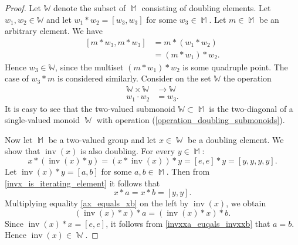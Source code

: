 \documentclass[10pt,a4paper]{amsart}
\DeclareMathOperator{\M}{\mathbb{M}}
\DeclareMathOperator{\W}{\mathbb{W}}
\DeclareMathOperator{\inv}{\mathrm{inv}}
\begin{document}
\begin{proof}
Let $\mathbb{W}$ denote the subset of $\M$ consisting of doubling elements. Let $w_1, w_2\in\mathbb{W}$ and let $w_1\ast w_2 = [w_3, w_3]$ for some $w_3\in\M$. Let $m\in\M$ be an arbitrary element. We have
$$\begin{aligned}
[m\ast w_3, m\ast w_3] &= m\ast (w_1\ast w_2)\\
&= (m\ast w_1)\ast w_2.
\end{aligned}$$
Hence $w_3\in \mathbb{W}$, since the multiset $(m\ast w_1)\ast w_2$ is some quadruple point. The case of $w_3\ast m$ is considered similarly. Consider on the set $\mathbb{W}$ the operation
\begin{equation}
\begin{aligned}\label{operation_doubling_submonoids}
\mathbb{W}\times \mathbb{W}&\to \mathbb{W}\\
w_1\cdot w_2 &= w_3.
\end{aligned}
\end{equation}
It is easy to see that the two-valued submonoid $\mathbb{W}\subset\M$ is the two-diagonal of a single-valued monoid $\W$ with operation (\ref{operation_doubling_submonoids}).

{Now let $\M$ be a two-valued group and let $x\in \W$ be a doubling element. We show that $\inv(x)$ is also doubling. For every $y\in\M$:
\begin{equation}\label{invx_is_iterating_element}
x\ast(\inv(x)\ast y) = (x\ast \inv(x))\ast y = [e,e]\ast y =  [y,y,y,y].
\end{equation}
Let $\inv(x)\ast y = [a, b]$ for some $a, b\in \M$. Then from \eqref{invx_is_iterating_element} it follows that
\begin{equation}\label{ax_equals_xb}
x\ast a = x\ast b = [y,y].
\end{equation}
Multiplying equality \eqref{ax_equals_xb} on the left by $\inv(x)$, we obtain
\begin{equation}\label{invxxa_euqals_invxxb}
(\inv(x)\ast x)\ast a = (\inv(x)\ast x)\ast b.
\end{equation}
Since $\inv(x)\ast x = [e,e]$, it follows from \eqref{invxxa_euqals_invxxb} that $a = b$. Hence $\inv(x)\in\W$.}
      
\end{proof}
\end{document}
